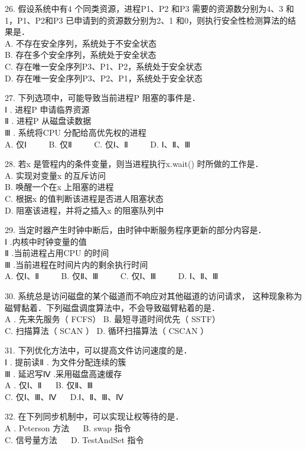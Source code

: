 26. 假设系统中有4 个同类资源，进程P1、P2 和P3 需要的资源数分别为4、3 和1，P1、P2和P3 已申请到的资源数分别为2、1 和0，则执行安全性检测算法的结果是． \\
A. 不存在安全序列，系统处于不安全状态 \\
B. 存在多个安全序列，系统处于安全状态 \\
C. 存在唯一安全序列P3、P1、P2，系统处于安全状态 \\
D. 存在唯一安全序列P3、P2、P1，系统处于安全状态

27. 下列选项中，可能导致当前进程P 阻塞的事件是． \\
Ⅰ . 进程P 申请临界资源 \\
Ⅱ . 进程P 从磁盘读数据 \\
Ⅲ . 系统将CPU 分配给高优先权的进程 \\
A. 仅Ⅰ $\qquad$ B. 仅Ⅱ $\qquad$ C. 仅Ⅰ、Ⅱ $\qquad$ D. Ⅰ、Ⅱ、Ⅲ

28. 若x 是管程内的条件变量，则当进程执行x.wait() 时所做的工作是． \\
A. 实现对变量x 的互斥访问 \\
B. 唤醒一个在x 上阻塞的进程 \\
C. 根据x 的值判断该进程是否进人阻塞状态 \\
D. 阻塞该进程，并将之插入x 的阻塞队列中

29. 当定时器产生时钟中断后，由时钟中断服务程序更新的部分内容是． \\
Ⅰ .内核中时钟变量的值 \\
Ⅱ .当前进程占用CPU 的时间 \\
Ⅲ .当前进程在时间片内的剩余执行时间 \\
A. 仅Ⅰ、Ⅱ $\qquad$ B. 仅Ⅱ、Ⅲ $\qquad$ C. 仅Ⅰ、Ⅲ $\qquad$ D. Ⅰ、Ⅱ、Ⅲ

30. 系统总是访问磁盘的某个磁道而不响应对其他磁道的访问请求， 这种现象称为磁臂黏着．下列磁盘调度算法中，不会导致磁臂粘着的是． \\
A . 先来先服务（ FCFS） B. 最短寻道时间优先（ SSTF） \\
C. 扫描算法（ SCAN ） D. 循环扫描算法（ CSCAN ）

31. 下列优化方法中，可以提高文件访问速度的是． \\
Ⅰ . 提前读Ⅱ . 为文件分配连续的簇 \\
Ⅲ . 延迟写Ⅳ .采用磁盘高速缓存 \\
A . 仅Ⅰ、Ⅱ $\quad$ B. 仅Ⅱ、Ⅲ \\
C. 仅Ⅰ、Ⅲ、Ⅳ $\quad$ D.Ⅰ、Ⅱ、Ⅲ、Ⅳ

32. 在下列同步机制中，可以实现让权等待的是． \\
A . Peterson 方法 $\quad$ B. swap 指令 \\
C. 信号量方法 $\quad$ D. TestAndSet 指令

